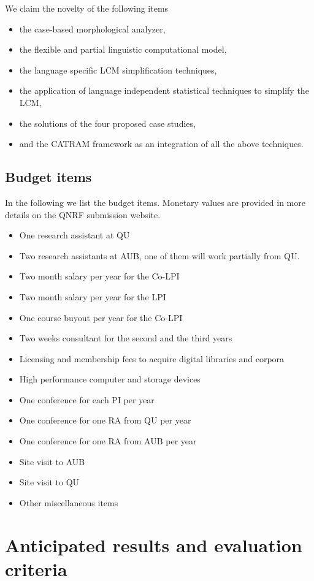 \documentclass[12pt]{article}
\begin{document}
We claim the novelty of the following items
\begin{itemize}
\item the case-based morphological analyzer,
\item the flexible and partial linguistic computational model,
\item the language specific LCM simplification techniques,
\item the application of language independent statistical techniques
to simplify the LCM,
\item the solutions of the four proposed case studies,
\item and the CATRAM framework as an integration of all the above techniques.
\end{itemize}

\subsection{Budget items}

In the following we list the budget items. 
Monetary values are provided in more details on the QNRF 
submission website. 

\begin{itemize}
\item One research assistant at QU
\item Two research assistants at AUB, one of them will 
work partially from QU. 
\item Two month salary per year for the Co-LPI
\item Two month salary per year for the LPI
\item One course buyout per year for the Co-LPI
\item Two weeks consultant for the second and the third years
\item Licensing and membership fees to acquire digital libraries and corpora
\item High performance computer and storage devices
\item One conference for each PI per year
\item One conference for one RA from QU per year
\item One conference for one RA from AUB per year
\item Site visit to AUB 
\item Site visit to QU 
\item Other miscellaneous items
\end{itemize}


\section{Anticipated results and evaluation criteria}
\label{s:results}
\end{document}
